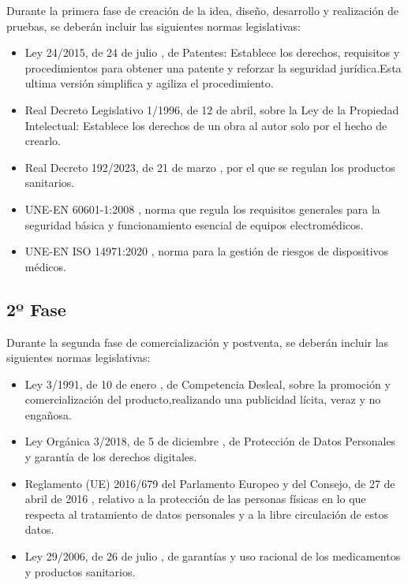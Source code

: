 Durante la primera fase de creación de la idea, diseño, desarrollo y realización de pruebas, se deberán incluir las siguientes normas legislativas: 

\begin{itemize}
    \item Ley 24/2015, de 24 de julio \cite{boe--2015-8328}, de Patentes: Establece los derechos, requisitos y procedimientos para obtener una patente y reforzar la seguridad jurídica.Esta ultima versión simplifica y agiliza el procedimiento.
    \item Real Decreto Legislativo 1/1996, de 12 de abril,\cite{boe--1996-8930} sobre la Ley de la Propiedad Intelectual: Establece los derechos de un obra al autor solo por el hecho de crearlo. 
    \item Real Decreto 192/2023, de 21 de marzo \cite{ministerio_de_sanidad_real_2023}, por el que se regulan los productos sanitarios. 
    \item UNE-EN 60601-1:2008 \cite{UNE2008}, norma que regula los requisitos generales para la seguridad básica y funcionamiento esencial de equipos electromédicos.
    \item UNE-EN ISO 14971:2020 \cite{UNE2020}, norma para la gestión de riesgos de dispositivos médicos.

\end{itemize}

\subsection{2º Fase}
Durante la segunda fase de comercialización y postventa, se deberán incluir las siguientes normas legislativas: 
\begin{itemize}
    \item Ley 3/1991, de 10 de enero \cite{boe--1991-628}, de Competencia Desleal, sobre la promoción y comercialización del producto,realizando una publicidad lícita, veraz y no engañosa.
    \item Ley Orgánica 3/2018, de 5 de diciembre \cite{boe--2018-16673}, de Protección de Datos Personales y garantía de los derechos digitales.
    \item Reglamento (UE) 2016/679 del Parlamento Europeo y del Consejo, de 27 de abril de 2016 \cite{boees}, relativo a la protección de las personas físicas en lo que respecta al tratamiento de datos personales y a la libre circulación de estos datos.
    \item Ley 29/2006, de 26 de julio \cite{boe--2006-13554}, de garantías y uso racional de los medicamentos y productos sanitarios.
\end{itemize}
